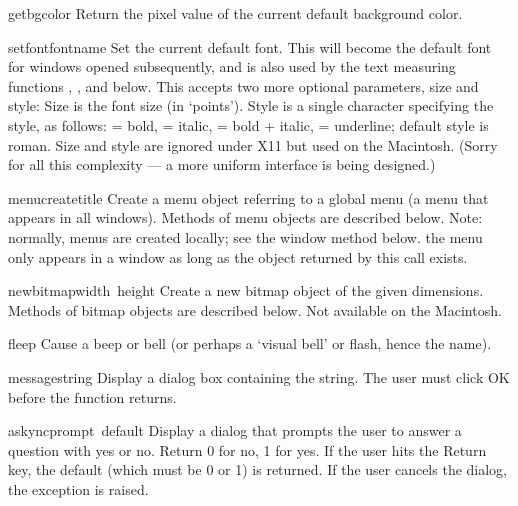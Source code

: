 \begin{funcdesc}{getbgcolor}{}
Return the pixel value of the current default background color.
\end{funcdesc}

\begin{funcdesc}{setfont}{fontname}
Set the current default font.
This will become the default font for windows opened subsequently,
and is also used by the text measuring functions ,
,  and  below.
This accepts two more optional parameters, size and style:
Size is the font size (in `points').
Style is a single character specifying the style, as follows:
 = bold,
 = italic,
 = bold + italic,
 = underline;
default style is roman.
Size and style are ignored under X11 but used on the Macintosh.
(Sorry for all this complexity --- a more uniform interface is being designed.)
\end{funcdesc}

\begin{funcdesc}{menucreate}{title}
Create a menu object referring to a global menu (a menu that appears in
all windows).
Methods of menu objects are described below.
Note: normally, menus are created locally; see the window method
 below.
 the menu only appears in a window as long as the object
returned by this call exists.
\end{funcdesc}

\begin{funcdesc}{newbitmap}{width\, height}
Create a new bitmap object of the given dimensions.
Methods of bitmap objects are described below.
Not available on the Macintosh.
\end{funcdesc}

\begin{funcdesc}{fleep}{}
Cause a beep or bell (or perhaps a `visual bell' or flash, hence the
name).
\end{funcdesc}

\begin{funcdesc}{message}{string}
Display a dialog box containing the string.
The user must click OK before the function returns.
\end{funcdesc}

\begin{funcdesc}{askync}{prompt\, default}
Display a dialog that prompts the user to answer a question with yes or
no.
Return 0 for no, 1 for yes.
If the user hits the Return key, the default (which must be 0 or 1) is
returned.
If the user cancels the dialog, the
exception is raised.
\end{funcdesc}

